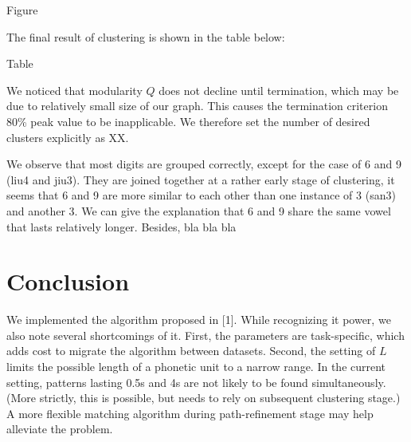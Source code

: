 \documentclass{article}
\begin{document}
    Figure

    The final result of clustering is shown in the table below:

    Table

    We noticed that modularity $Q$ does not decline until termination, which may be due to relatively small size
    of our graph. This causes the termination criterion 80\% peak value to be inapplicable. We therefore set 
    the number of desired clusters explicitly as XX. 
    
    We observe that most digits are grouped correctly, except 
    for the case of 6 and 9 (liu4 and jiu3). They are joined together at a rather early stage of clustering, 
    it seems that 6 and 9 are more similar to each other than one instance of 3 (san3) and another 3. We can 
    give the explanation that 6 and 9 share the same vowel that lasts relatively longer. Besides, bla bla bla

\section{Conclusion}
    We implemented the algorithm proposed in [1]. While recognizing it power, we also note several 
    shortcomings of it. First, the parameters are task-specific, which adds cost to migrate the algorithm 
    between datasets. Second, the setting of $L$ limits the possible length of a phonetic unit to 
    a narrow range. In the current setting, patterns lasting 0.5s and 4s are not likely to be found simultaneously.
    (More strictly, this is possible, but needs to rely on subsequent clustering stage.) A more flexible 
    matching algorithm during path-refinement stage may help alleviate the problem.
\end{document}
